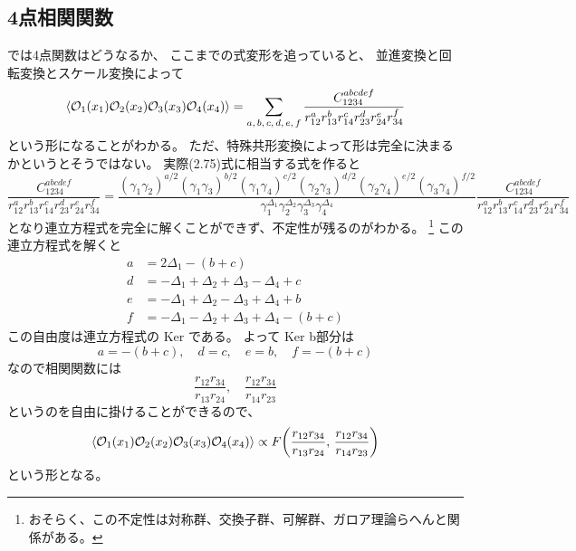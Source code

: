 \documentclass[../../master.tex]{subfiles}
\begin{document}
\subsection*{4点相関関数}
では4点関数はどうなるか、
ここまでの式変形を追っていると、
並進変換と回転変換とスケール変換によって
\begin{equation}
    \ev{\mathcal{O}_1(x_1)\mathcal{O}_2(x_2)\mathcal{O}_3(x_3)\mathcal{O}_4(x_4)}
    = \sum_{a,\,b,\,c,\,d,\,e,\,f}\frac{C_{1234}^{abcdef}}{r_{12}^a r_{13}^b r_{14}^c r_{23}^d r_{24}^e r_{34}^f} \\
\end{equation}
という形になることがわかる。
ただ、特殊共形変換によって形は完全に決まるかというとそうではない。
実際(2.75)式に相当する式を作ると
\begin{equation*}
    \frac{C_{1234}^{abcdef}}{r_{12}^a r_{13}^b r_{14}^c r_{23}^d r_{24}^e r_{34}^f}
    =\frac{
        (\gamma_1\gamma_2)^{a/2}(\gamma_1\gamma_3)^{b/2}(\gamma_1\gamma_4)^{c/2}
        (\gamma_2\gamma_3)^{d/2}(\gamma_2\gamma_4)^{e/2}(\gamma_3\gamma_4)^{f/2}
    }{
        \gamma_1^{\Delta_1}\gamma_2^{\Delta_2}\gamma_3^{\Delta_3}\gamma_4^{\Delta_4}}
    \frac{C_{1234}^{abcdef}}{r_{12}^a r_{13}^b r_{14}^c r_{23}^d r_{24}^e r_{34}^f}
\end{equation*}
となり連立方程式を完全に解くことができず、不定性が残るのがわかる。
\footnote{おそらく、この不定性は対称群、交換子群、可解群、ガロア理論らへんと関係がある。}
この連立方程式を解くと
\begin{align*}
    a &= 2\Delta_1 - (b+c)\\
    d &= -\Delta_1 + \Delta_2 + \Delta_3 - \Delta_4 +c\\
    e &= -\Delta_1 + \Delta_2 - \Delta_3 + \Delta_4 +b\\
    f &= -\Delta_1 - \Delta_2 + \Delta_3 + \Delta_4 -(b+c)
\end{align*}
この自由度は連立方程式の Ker である。
よって Ker b部分は
\begin{equation*}
    a = -(b+c),\quad d = c,\quad e = b ,\quad f = -(b+c)
\end{equation*}
なので相関関数には
\begin{equation}
    \frac{r_{12}r_{34}}{r_{13}r_{24}},\quad \frac{r_{12}r_{34}}{r_{14}r_{23}}
\end{equation}
というのを自由に掛けることができるので、
\begin{equation*}
    \ev{\mathcal{O}_1(x_1)\mathcal{O}_2(x_2)\mathcal{O}_3(x_3)\mathcal{O}_4(x_4)}
    \propto F\qty(\frac{r_{12}r_{34}}{r_{13}r_{24}},\, \frac{r_{12}r_{34}}{r_{14}r_{23}})
\end{equation*}
という形となる。
\end{document}
